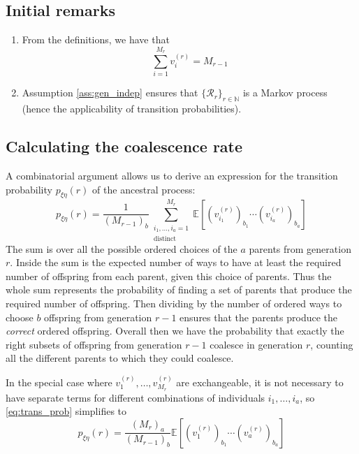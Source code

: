 \documentclass{article}
\newcommand{\E}{\mathbb{E}}
\begin{document}
\subsection*{Initial remarks}
\begin{enumerate}
\item From the definitions, we have that
\begin{equation}\label{eq:sum_vi}
\sum_{i=1}^{M_r} v_i^{(r)} = M_{r-1}
\end{equation}
\item Assumption \ref{ass:gen_indep} ensures that $\{\mathcal{R}_r\}_{r\in\mathbb{N}}$ is a Markov process (hence the applicability of transition probabilities).
\end{enumerate}

\subsection*{Calculating the coalescence rate}
A combinatorial argument allows us to derive an expression for the transition probability $p_{\xi\eta}(r)$ of the ancestral process:
\begin{equation}\label{eq:trans_prob}
p_{\xi\eta}(r) = \frac{1}{(M_{r-1})_b} \sum_{\substack{i_1,\dots,i_a =1 \\ \text{distinct}}}^{M_r} \E\left[(v_{i_1}^{(r)})_{b_1}\cdots (v_{i_a}^{(r)})_{b_a}\right]
\end{equation}
The sum is over all the possible ordered choices of the $a$ parents from generation $r$. Inside the sum is the expected number of ways to have at least the required number of offspring from each parent, given this choice of parents. Thus the whole sum represents the probability of finding a set of parents that produce the required number of offspring. Then dividing by the number of ordered ways to choose $b$ offspring from generation $r-1$ ensures that the parents produce the \emph{correct} ordered offspring. Overall then we have the probability that exactly the right subsets of offspring from generation $r-1$ coalesce in generation $r$, counting all the different parents to which they could coalesce.

In the special case where $ v_1^{(r)},\dots,v_{M_r}^{(r)}$ are exchangeable, it is not necessary to have separate terms for different combinations of individuals $i_1,\dots,i_a$, so \eqref{eq:trans_prob} simplifies to
\begin{equation}\label{eq:trans_prob_exch}
p_{\xi\eta}(r) = \frac{(M_r)_a}{(M_{r-1})_b} \E\left[(v_{1}^{(r)})_{b_1}\cdots (v_{a}^{(r)})_{b_a}\right]
\end{equation}
\end{document}
